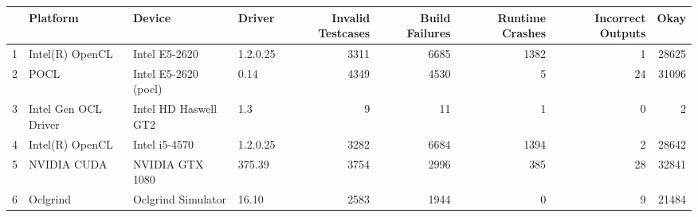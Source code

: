 \begin{tabular}{llllrrrrr}
\toprule
{} &              Platform &                Device &    Driver &  Invalid Testcases &  Build Failures &  Runtime Crashes &  Incorrect Outputs &   Okay \\
\midrule
1 &       Intel(R) OpenCL &         Intel E5-2620 &  1.2.0.25 &               3311 &            6685 &             1382 &                  1 &  28625 \\
2 &                  POCL &  Intel E5-2620 (pocl) &      0.14 &               4349 &            4530 &                5 &                 24 &  31096 \\
3 &  Intel Gen OCL Driver &  Intel HD Haswell GT2 &       1.3 &                  9 &              11 &                1 &                  0 &      2 \\
4 &       Intel(R) OpenCL &         Intel i5-4570 &  1.2.0.25 &               3282 &            6684 &             1394 &                  2 &  28642 \\
5 &           NVIDIA CUDA &       NVIDIA GTX 1080 &    375.39 &               3754 &            2996 &              385 &                 28 &  32841 \\
6 &              Oclgrind &    Oclgrind Simulator &     16.10 &               2583 &            1944 &                0 &                  9 &  21484 \\
\bottomrule
\end{tabular}
